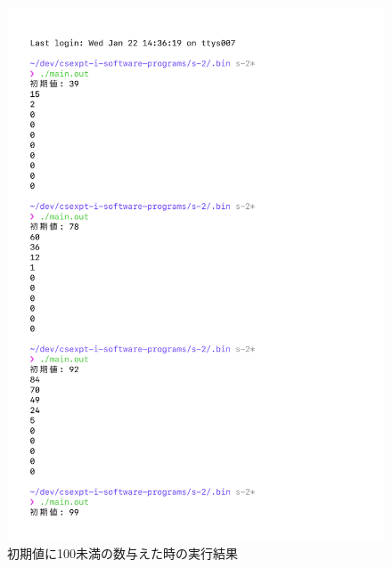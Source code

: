 % 
\begin{figure}[H]
    \centering
    \includegraphics[width=0.8\hsize, pagebox=mediabox, page=1]{main_result3.pdf}
    \caption{初期値に100未満の数与えた時の実行結果}
    \label{初期値に100未満の数与えた時の実行結果}
\end{figure}
